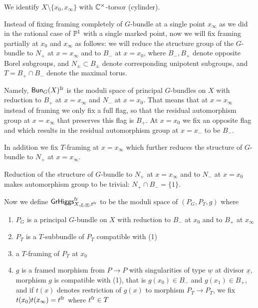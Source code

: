\documentclass[12pt,psamsfonts,reqno]{amsart}
\begin{document}
We identify $X \setminus \{x_0, x_\infty\}$ with $\mathbb C^{\times}$-torsor (cylinder). 

Instead of fixing framing completely of $G$-bundle at a single point $x_\infty$ as we did in the rational case of $\mathbb P^{1}$ with a single marked point,
now we will fix framing partially at $x_0$ and $x_\infty$ as follows: we will reduce the structure group of the $G$-bundle to $N_{+}$ at $x=x_{\infty}$ and to
$B_{-}$ at $x = x_0$, where $B_{-}, B_{+}$ denote opposite Borel subgroups, and $N_{\pm} \subset B_{\pm}$ denote corresponding unipotent subgroups, and
$T= B_{+} \cap B_{-}$ denote the maximal torus. 



Namely, $\mathsf{Bun}_{G}(X)^{\mathrm{fr}}$ is the moduli space of principal $G$-bundles on $X$ with reduction to $B_{+}$ at $x=x_\infty$ and $N_{-}$ at $x = x_{0}$.
That means that at $x=x_{\infty}$ instead of framing we only fix a full flag, so that the residual
automorphism group at $x = x_\infty$ that preserves this flag is $B_{+}$. At $x = x_{0}$ we fix an opposite flag and which results in the residual automorphism
group at $x = x_{-}$ to be $B_{-}$.

In addition we fix $T$-framing at $x = x_\infty$ which further reduces the structure of $G$-bundle to $N_{+}$ at $x = x_\infty$. 

Reduction of the structure of $G$-bundle to $N_{+}$ at $x = x_\infty$ and to $N_{-}$ at $x = x_{0}$ makes automorphism group to be trivial: $N_{+} \cap B_{-} = \{1 \}$. 

Now we define $\mathsf{GrHiggs}_{X,\underline{x}, \underline{w}, t^{\mathrm{fr}}}^{\mathrm{fr}}$
to be the moduli space of  $(P_G,P_T,g)$ where

\begin{enumerate}
\item $P_G$ is a principal $G$-bundle on $X$ with reduction to $B_{-}$ at $x_0$ and to $B_{+}$ at $x_{\infty}$
\item $P_T$ is a $T$-subbundle of $P_{T}$ compatible with (1)
\item a $T$-framing of $P_{T}$ at $x_0$
\item $g$ is a framed morphism from $P \to P$ with singularities of type $\underline{w}$ at divisor $\underline{x}$, morphism $g$ is compatible with (1), that is $g(x_0) \in B_{-}$ and $g(x_1) \in B_{+}$, and if
  $t(x)$ denotes restriction of $g(x)$ to morphism $P_{T} \to P_{T}$,
  we fix $t(x_0) t(x_\infty) = t^{\mathrm{fr}}$ where $t^{\mathrm{fr}} \in T$ 
\end{enumerate}
\end{document}
